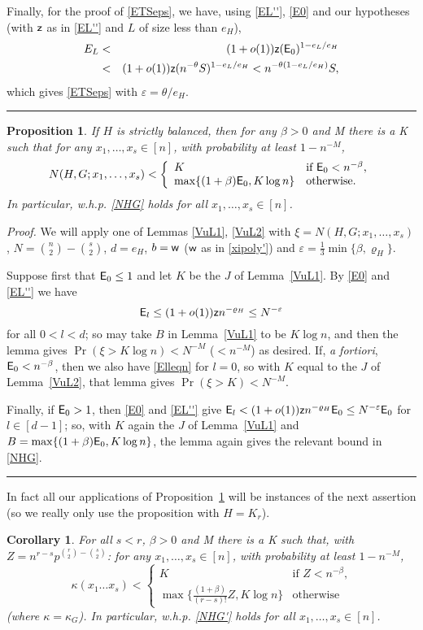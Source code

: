 \documentclass[letterpaper,11pt]{article}
\newtheorem{prop}[thm]{Proposition}
\newtheorem{cor}[thm]{Corollary}
\newcommand{\beq}[1]{\begin{equation}\label{#1}}
\newcommand{\enq}[0]{\end{equation}}
\newcommand{\nin}[0]{\noindent}
\renewcommand{\dots}[0]{,\ldots,}
\newcommand{\ww}{\mbox{{\sf w}}}
\newcommand{\zz}[0]{\mbox{{\sf z}}}
\newcommand{\0}[0]{\emptyset}
\renewcommand{\qed}[0]{\begin{flushright} \rule{2mm}{3mm} \end{flushright}}
\newcommand{\C}[2]{{{#1}\choose{{#2}}}}
\newcommand{\gb}[0]{\beta }
\newcommand{\eps}[0]{\varepsilon }
\newcommand{\vr}[0]{\varrho}
\begin{document}
\medskip
Finally, for the proof of \eqref{ETSeps}, we have, using
\eqref{EL''}, \eqref{E0}
and our hypotheses
(with $\zz$ as in \eqref{EL''} and $L$ of size less than $e_H$),
\begin{eqnarray*}
E_L
&< & (1+o(1))\zz (\E_0)^{1-e_L/e_H}\\
&<& (1+o(1))\zz (n^{-\theta}S)^{1-e_L/e_H}
< n^{-\theta(1-e_L/e_H)}S,
\end{eqnarray*}
which gives \eqref{ETSeps} with $\eps = \theta/e_H$.\qed



\begin{prop}\label{PExt}
If $H$ is strictly balanced, then for any
$\gb>0$ and M there is a K such that
for any $x_1\dots x_s\in [n]$, with probability at least
$1-n^{-M}$,
\beq{NHG}
N(H,G;x_1\dots x_s) < \left\{\begin{array}{ll}
K & \mbox{if $\E_0< n^{-\gb}$,}\\
\max\{(1+\gb)\E_0,K\log n\} &\mbox{otherwise.}
\end{array}\right.
\enq
In particular, w.h.p. \eqref{NHG} holds
for all $x_1\dots x_s\in [n]$.
\end{prop}


\nin
{\em Proof.}
We will apply one of
Lemmas \ref{VuL1}, \ref{VuL2} with
$\xi=N(H,G;x_1\dots x_s)$, $N=\C{n}{2}-\C{s}{2}$,
$d=e_H$, $b=\ww$ ($\ww$ as in \eqref{xipoly'}) and
$\eps =\frac13\min\{\gb,\vr_H\}$.

Suppose first that ${\sf E}_0\leq 1$ and let $K$ be the $J$ of
Lemma~\ref{VuL1}.
By \eqref{E0} and \eqref{EL''} we have
\beq{Elleqn}
\E_l\leq (1+o(1))\zz n^{-\vr_H}\leq N^{-\eps}
\enq
for all $ 0<l<d$;
so may take $B$ in Lemma~\ref{VuL1} to be $K \log n$,
and then the lemma gives $\Pr(\xi> K\log n)<N^{-M}$ ($ < n^{-M}$)
as desired.
If, {\em a fortiori}, $\E_0<n^{-\gb}$, then we also have
\eqref{Elleqn} for $l=0$, so with
$K$ equal to the $J$ of Lemma~\ref{VuL2}, that lemma gives
$\Pr(\xi>K)< N^{-M}$.

Finally, if ${\sf E}_0>1$, then \eqref{E0} and \eqref{EL''} give
$\E_l< (1+o(1))\zz n^{-\vr_H}\E_0\leq N^{-\eps}\E_0$ for $l\in [d-1]$;
so, with $K$ again the $J$ of Lemma~\ref{VuL1} and
$B=\max\{(1+\gb)\E_0,K\log n\}$, the lemma again
gives the relevant bound in \eqref{NHG}.\qed


In fact all our applications of
Proposition~\ref{PExt} will be instances of the next assertion
(so we really only use the proposition with $H=K_r$).

\begin{cor}\label{KrCor}
For all $s<r$,
$\gb>0$ and M there is a K such that,
with
$Z=n^{r-s}p^{\C{r}{2}-\C{s}{2}}$:
for any $x_1\dots x_s\in [n]$, with probability
at least $1-n^{-M}$,
\beq{NHG'}
\kappa(x_1\ldots x_s) < \left\{\begin{array}{ll}
K & \mbox{if $Z< n^{-\gb}$,}\\
\max\{\tfrac{(1+\gb)}{(r-s)!}Z,K\log n\}
&\mbox{otherwise}
\end{array}\right.
\enq
(where $\kappa =\kappa_G$).
In particular, w.h.p. \eqref{NHG'} holds
for all $x_1\dots x_s\in [n]$.
%
%
\end{cor}
\end{document}
